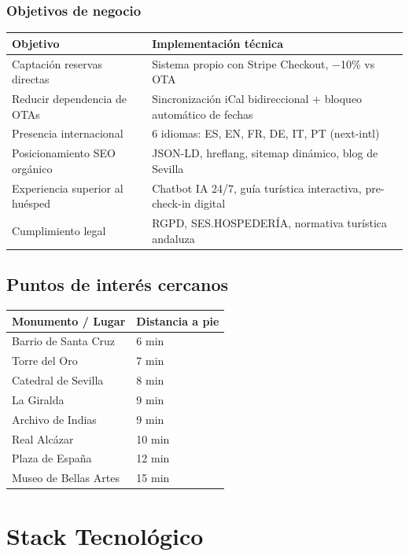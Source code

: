 \documentclass[12pt,a4paper,twoside,openright]{report}
\begin{document}
\subsection{Objetivos de negocio}

\begin{longtable}{L{4.5cm} L{8cm}}
  \toprule
  \textbf{Objetivo} & \textbf{Implementación técnica} \\
  \midrule
  Captación reservas directas & Sistema propio con Stripe Checkout, −10\% vs OTA \\
  \addlinespace
  Reducir dependencia de OTAs & Sincronización iCal bidireccional + bloqueo automático de fechas \\
  \addlinespace
  Presencia internacional & 6 idiomas: ES, EN, FR, DE, IT, PT (next-intl) \\
  \addlinespace
  Posicionamiento SEO orgánico & JSON-LD, hreflang, sitemap dinámico, blog de Sevilla \\
  \addlinespace
  Experiencia superior al huésped & Chatbot IA 24/7, guía turística interactiva, pre-check-in digital \\
  \addlinespace
  Cumplimiento legal & RGPD, SES.HOSPEDERÍA, normativa turística andaluza \\
  \bottomrule
\end{longtable}

\section{Puntos de interés cercanos}

\begin{longtable}{L{5cm} C{3cm}}
  \toprule
  \textbf{Monumento / Lugar} & \textbf{Distancia a pie} \\
  \midrule
  Barrio de Santa Cruz & 6 min \\
  Torre del Oro & 7 min \\
  Catedral de Sevilla & 8 min \\
  La Giralda & 9 min \\
  Archivo de Indias & 9 min \\
  Real Alcázar & 10 min \\
  Plaza de España & 12 min \\
  Museo de Bellas Artes & 15 min \\
  \bottomrule
\end{longtable}

\chapter{Stack Tecnológico}
\end{document}
